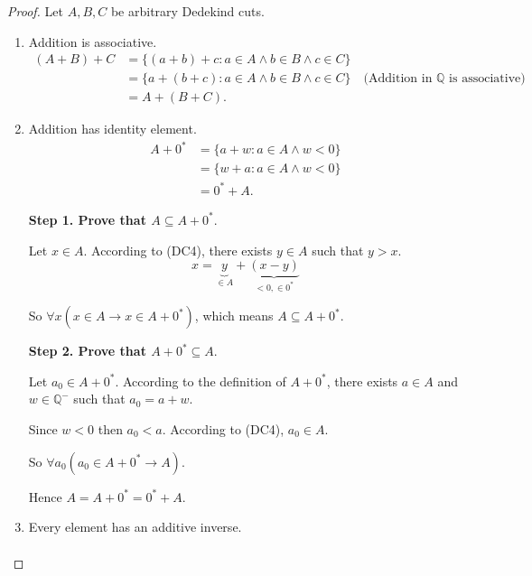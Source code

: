 \begin{proof}
    Let $A, B, C$ be arbitrary Dedekind cuts.
    \begin{enumerate}[label = (F\arabic*)]
        \item Addition is associative.
              \begin{align*}
                  (A + B) + C & = \{ (a + b) + c : a\in A\land b\in B\land c\in C \}                                                       \\
                              & = \{ a + (b + c) : a\in A\land b\in B\land c\in C \} \quad\text{(Addition in $\mathbb{Q}$ is associative)} \\
                              & = A + (B + C).
              \end{align*}
        \item Addition has identity element.
              \begin{align*}
                  A + {0}^{*} & = \{ a + w : a\in A\land w < 0 \} \\
                              & = \{ w + a : a\in A\land w < 0 \} \\
                              & = {0}^{*} + A.
              \end{align*}
              \par \textbf{Step 1. Prove that $A \subseteq A + {0}^{*}$}.
              \par Let $x\in A$. According to (DC4), there exists $y\in A$ such that $y > x$.
              \[
                  x = \underbrace{y}_{\in A} + \underbrace{(x - y)}_{< 0, \in {0}^{*}}
              \]
              \par So $\forall x(x\in A \rightarrow x\in A + {0}^{*})$, which means $A \subseteq A + {0}^{*}$.
              \bigskip
              \par \textbf{Step 2. Prove that $A + {0}^{*} \subseteq A$}.
              \par Let $a_{0}\in A + {0^{*}}$. According to the definition of $A + {0}^{*}$, there exists $a\in A$ and $w\in\mathbb{Q}^{-}$ such that $a_{0} = a + w$.
              \par Since $w < 0$ then $a_{0} < a$. According to (DC4), $a_{0}\in A$.
              \par So $\forall a_{0}(a_{0}\in A + {0}^{*} \rightarrow A)$.
              \par Hence $A = A + {0}^{*} = {0}^{*} + A$.
        \item Every element has an additive inverse.
              \begin{align*}

\end{align*}
\end{enumerate}
\end{proof}
